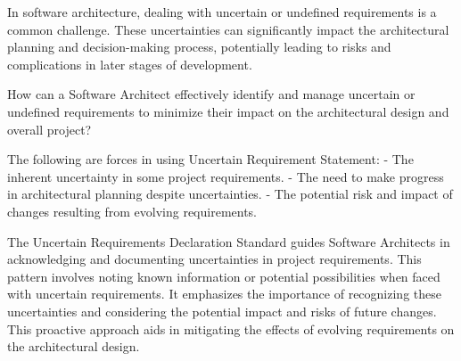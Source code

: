 \texttt{}

 In software architecture, dealing with uncertain or undefined requirements is a common challenge. These uncertainties can significantly impact the architectural planning and decision-making process, potentially leading to risks and complications in later stages of development. 

 How can a Software Architect effectively identify and manage uncertain or undefined requirements to minimize their impact on the architectural design and overall project?

 The following are forces in using Uncertain Requirement Statement: 
\newline
- The inherent uncertainty in some project requirements.
\newline
- The need to make progress in architectural planning despite uncertainties.
\newline
- The potential risk and impact of changes resulting from evolving requirements.

The Uncertain Requirements Declaration Standard guides Software Architects in acknowledging and documenting uncertainties in project requirements. This pattern involves noting known information or potential possibilities when faced with uncertain requirements. It emphasizes the importance of recognizing these uncertainties and considering the potential impact and risks of future changes. This proactive approach aids in mitigating the effects of evolving requirements on the architectural design. 




